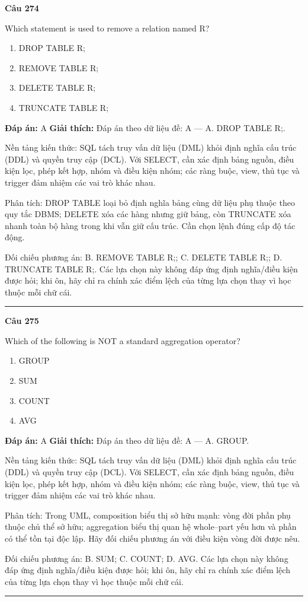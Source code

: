 \documentclass[11pt,a4paper]{article}
\newenvironment{question}[1]{%
  \par\vspace{1em}\noindent\textbf{\large Câu #1}\par\vspace{0.4em}
}{%
  \par\vspace{1em}\hrule\vspace{0.6em}
}
\newenvironment{choices}{%
  \begin{enumerate}[label=\textbf{\Alph*.},leftmargin=2.2em,itemsep=2pt,topsep=3pt]
}{%
  \end{enumerate}
}
\newcommand{\choice}{\item}
\begin{document}
\begin{question}{274}
Which statement is used to remove a relation named R?
\begin{choices}
\choice DROP TABLE R;
\choice REMOVE TABLE R;
\choice DELETE TABLE R;
\choice TRUNCATE TABLE R;
\end{choices}
\textbf{Đáp án:} A
\textbf{Giải thích:} Đáp án theo dữ liệu đề: A — A. DROP TABLE R;.

Nền tảng kiến thức: SQL tách truy vấn dữ liệu (DML) khỏi định nghĩa cấu trúc (DDL) và quyền truy cập (DCL). Với SELECT, cần xác định bảng nguồn, điều kiện lọc, phép kết hợp, nhóm và điều kiện nhóm; các ràng buộc, view, thủ tục và trigger đảm nhiệm các vai trò khác nhau.

Phân tích: DROP TABLE loại bỏ định nghĩa bảng cùng dữ liệu phụ thuộc theo quy tắc DBMS; DELETE xóa các hàng nhưng giữ bảng, còn TRUNCATE xóa nhanh toàn bộ hàng trong khi vẫn giữ cấu trúc. Cần chọn lệnh đúng cấp độ tác động.

Đối chiếu phương án: B. REMOVE TABLE R;; C. DELETE TABLE R;; D. TRUNCATE TABLE R;. Các lựa chọn này không đáp ứng định nghĩa/điều kiện được hỏi; khi ôn, hãy chỉ ra chính xác điểm lệch của từng lựa chọn thay vì học thuộc mỗi chữ cái.
\end{question}

\begin{question}{275}
Which of the following is NOT a standard aggregation operator?
\begin{choices}
\choice GROUP
\choice SUM
\choice COUNT
\choice AVG
\end{choices}
\textbf{Đáp án:} A
\textbf{Giải thích:} Đáp án theo dữ liệu đề: A — A. GROUP.

Nền tảng kiến thức: SQL tách truy vấn dữ liệu (DML) khỏi định nghĩa cấu trúc (DDL) và quyền truy cập (DCL). Với SELECT, cần xác định bảng nguồn, điều kiện lọc, phép kết hợp, nhóm và điều kiện nhóm; các ràng buộc, view, thủ tục và trigger đảm nhiệm các vai trò khác nhau.

Phân tích: Trong UML, composition biểu thị sở hữu mạnh: vòng đời phần phụ thuộc chủ thể sở hữu; aggregation biểu thị quan hệ whole–part yếu hơn và phần có thể tồn tại độc lập. Hãy đối chiếu phương án với điều kiện vòng đời được nêu.

Đối chiếu phương án: B. SUM; C. COUNT; D. AVG. Các lựa chọn này không đáp ứng định nghĩa/điều kiện được hỏi; khi ôn, hãy chỉ ra chính xác điểm lệch của từng lựa chọn thay vì học thuộc mỗi chữ cái.
\end{question}
\end{document}
